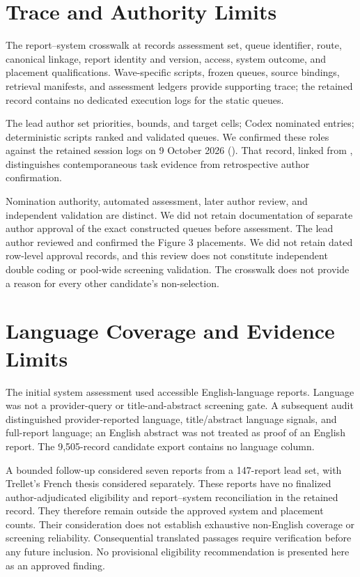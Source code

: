 \documentclass[11pt]{article}
\begin{document}
\section{Trace and Authority Limits}
The report--system crosswalk at  records assessment set, queue identifier, route, canonical linkage, report identity and version, access, system outcome, and placement qualifications. Wave-specific scripts, frozen queues, source bindings, retrieval manifests, and assessment ledgers provide supporting trace; the retained record contains no dedicated execution logs for the static queues.

The lead author set priorities, bounds, and target cells; Codex nominated entries; deterministic scripts ranked and validated queues. We confirmed these roles against the retained session logs on 9 October 2026 (). That record, linked from , distinguishes contemporaneous task evidence from retrospective author confirmation.

Nomination authority, automated assessment, later author review, and independent validation are distinct. We did not retain documentation of separate author approval of the exact constructed queues before assessment. The lead author reviewed and confirmed the Figure 3 placements. We did not retain dated row-level approval records, and this review does not constitute independent double coding or pool-wide screening validation. The crosswalk does not provide a reason for every other candidate's non-selection.

\section{Language Coverage and Evidence Limits}
The initial system assessment used accessible English-language reports. Language was not a provider-query or title-and-abstract screening gate. A subsequent audit distinguished provider-reported language, title/abstract language signals, and full-report language; an English abstract was not treated as proof of an English report. The 9,505-record candidate export contains no language column.

A bounded follow-up considered seven reports from a 147-report lead set, with Trellet's French thesis considered separately. These reports have no finalized author-adjudicated eligibility and report--system reconciliation in the retained record. They therefore remain outside the approved system and placement counts. Their consideration does not establish exhaustive non-English coverage or screening reliability. Consequential translated passages require verification before any future inclusion. No provisional eligibility recommendation is presented here as an approved finding.
\end{document}
